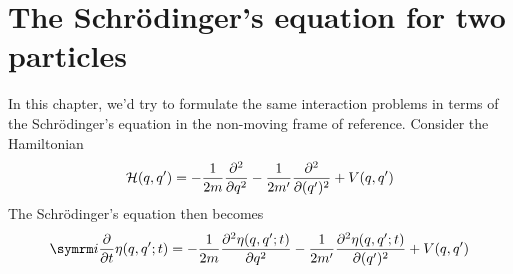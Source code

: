\chapter{The Schr\"odinger's equation for two particles}

In this chapter, we'd try to formulate the same interaction problems in terms of the Schr\"odinger's equation in the non-moving frame of reference. Consider the Hamiltonian
\begin{equation}
    \mathcal{H}(q, q') = -\frac{1}{2m}\pdv[2]{q} -\frac{1}{2m'}\pdv[2]{(q')} + V(q, q')
\end{equation}
The Schr\"odinger's equation then becomes
\begin{equation}
    \im\pdv{t}\eta(q, q'; t) = -\frac{1}{2m}\pdv[2]{\eta(q, q'; t)}{q} -\frac{1}{2m'}\pdv[2]{\eta(q, q'; t)}{(q')} + V(q, q')
\end{equation}